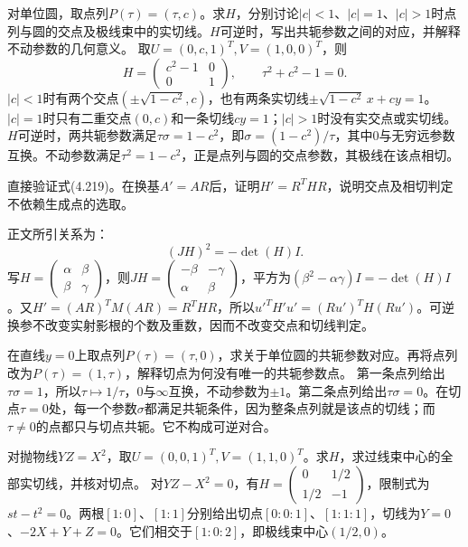 对单位圆，取点列\(P(\tau)=(\tau,c)\)。求\(H\)，分别讨论\(|c|<1\)、\(|c|=1\)、\(|c|>1\)时点列与圆的交点及极线束中的实切线。\(H\)可逆时，写出共轭参数之间的对应，并解释不动参数的几何意义。
\solutionanswer
取\(U=(0,c,1)^T,V=(1,0,0)^T\)，则
\[
 H=\begin{pmatrix}c^2-1&0\\0&1\end{pmatrix},\qquad
 \tau^2+c^2-1=0.
\]
\(|c|<1\)时有两个交点\((\pm\sqrt{1-c^2},c)\)，也有两条实切线\(\pm\sqrt{1-c^2}\,x+cy=1\)。\(|c|=1\)时只有二重交点\((0,c)\)和一条切线\(cy=1\)；\(|c|>1\)时没有实交点或实切线。
\(H\)可逆时，两共轭参数满足\(\tau\sigma=1-c^2\)，即\(\sigma=(1-c^2)/\tau\)，其中\(0\)与无穷远参数互换。不动参数满足\(\tau^2=1-c^2\)，正是点列与圆的交点参数，其极线在该点相切。


直接验证式\textup{(4.219)}。在换基\(A'=AR\)后，证明\(H'=R^THR\)，说明交点及相切判定不依赖生成点的选取。

\par\smallskip\noindent 正文所引关系为：
\begin{equation*}
(JH)^2=-\det(H)I.
\end{equation*}
\solutionanswer
写\(H=\left(\begin{smallmatrix}\alpha&\beta\\\beta&\gamma\end{smallmatrix}\right)\)，则\(JH=\left(\begin{smallmatrix}-\beta&-\gamma\\\alpha&\beta\end{smallmatrix}\right)\)，平方为\((\beta^2-\alpha\gamma)I=-\det(H)I\)。又\(H'=(AR)^TM(AR)=R^THR\)，所以\({u'}^TH'u'=(Ru')^TH(Ru')\)。可逆换参不改变实射影根的个数及重数，因而不改变交点和切线判定。


在直线\(y=0\)上取点列\(P(\tau)=(\tau,0)\)，求关于单位圆的共轭参数对应。再将点列改为\(P(\tau)=(1,\tau)\)，解释切点为何没有唯一的共轭参数点。
\solutionanswer
第一条点列给出\(\tau\sigma=1\)，所以\(\tau\mapsto1/\tau\)，\(0\)与\(\infty\)互换，不动参数为\(\pm1\)。第二条点列给出\(\tau\sigma=0\)。在切点\(\tau=0\)处，每一个参数\(\sigma\)都满足共轭条件，因为整条点列就是该点的切线；而\(\tau\ne0\)的点都只与切点共轭。它不构成可逆对合。


对抛物线\(YZ=X^2\)，取\(U=(0,0,1)^T,V=(1,1,0)^T\)。求\(H\)，求过线束中心的全部实切线，并核对切点。
\solutionanswer
对\(YZ-X^2=0\)，有\(H=\left(\begin{smallmatrix}0&1/2\\1/2&-1\end{smallmatrix}\right)\)，限制式为\(st-t^2=0\)。两根\([1:0]\)、\([1:1]\)分别给出切点\([0:0:1]\)、\([1:1:1]\)，切线为\(Y=0\)、\(-2X+Y+Z=0\)。它们相交于\([1:0:2]\)，即极线束中心\((1/2,0)\)。



